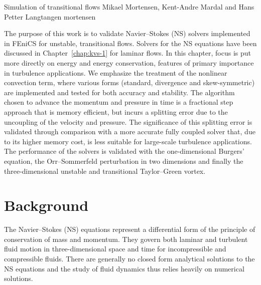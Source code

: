 \renewcommand{\vec}[1]{\ensuremath{{#1}}}
\newcommand{\Nset}{\ensuremath{\mathbb{N}}\xspace}
\newcommand{\Zset}{\ensuremath{\mathbb{Z}}\xspace}
\newcommand{\Qset}{\ensuremath{\mathbb{Q}}\xspace}
\newcommand{\Cset}{\ensuremath{\mathbb{C}}\xspace}
\newcommand{\Hdivnull}{\ensuremath{Z}}

              {Simulation of transitional flows}
              {Mikael Mortensen, Kent-Andre Mardal and Hans Petter Langtangen}
              {mortensen}


The purpose of this work is to validate Navier--Stokes (NS) solvers
implemented in FEniCS for unstable, transitional flows. Solvers for the
NS equations have been discussed in Chapter~\ref{chap:kvs-1} for
laminar flows. In this chapter, focus is put more directly on energy
and energy conservation, features of primary importance in turbulence
applications. We emphasize the treatment of the nonlinear convection
term, where various forms (standard, divergence and skew-symmetric) are
implemented and tested for both accuracy and stability. The algorithm
chosen to advance the momentum and pressure in time is a fractional step
approach that is memory efficient, but incurs a splitting error due to the
uncoupling of the velocity and pressure. The significance of this splitting
error is validated through comparison with a more accurate fully coupled
solver that, due to its higher memory cost, is less suitable for large-scale
turbulence applications. The performance of the solvers is validated with
the one-dimensional Burgers' equation, the Orr--Sommerfeld perturbation
in two dimensions and finally the three-dimensional unstable
and transitional Taylor--Green vortex.

\section{Background}

The Navier--Stokes (NS) equations represent a differential
form of the principle of conservation of mass and momentum. They govern
both laminar and turbulent fluid motion in three-dimensional space and
time for incompressible and compressible fluids. There are generally no
closed form analytical solutions to the NS equations and the study of
fluid dynamics thus relies heavily on numerical solutions.

